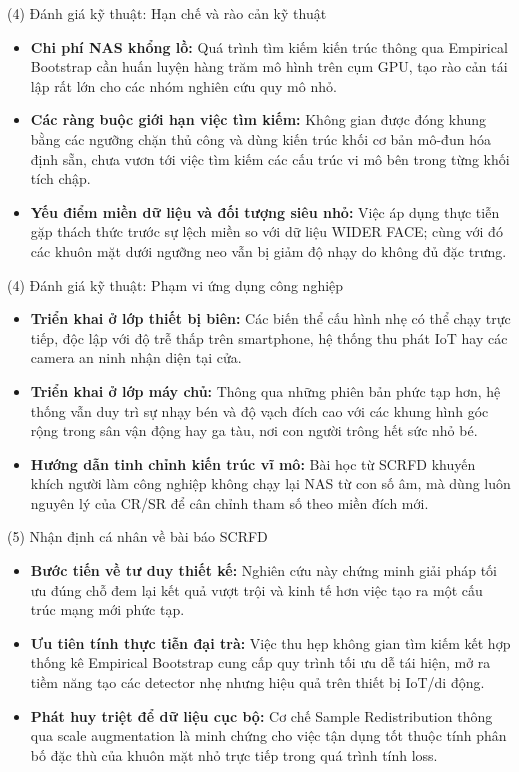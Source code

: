 \documentclass[aspectratio=169,11pt]{beamer}
\begin{document}
\begin{frame}{(4) Đánh giá kỹ thuật: Hạn chế và rào cản kỹ thuật}
  \begin{itemize}
    \setlength{\itemsep}{8pt}
    \item \textbf{Chi phí NAS khổng lồ:} Quá trình tìm kiếm kiến trúc thông qua Empirical Bootstrap cần huấn luyện hàng trăm mô hình trên cụm GPU, tạo rào cản tái lập rất lớn cho các nhóm nghiên cứu quy mô nhỏ.\ \cite{guo2022scrfd}
    \item \textbf{Các ràng buộc giới hạn việc tìm kiếm:} Không gian được đóng khung bằng các ngưỡng chặn thủ công và dùng kiến trúc khối cơ bản mô-đun hóa định sẵn, chưa vươn tới việc tìm kiếm các cấu trúc vi mô bên trong từng khối tích chập.
    \item \textbf{Yếu điểm miền dữ liệu và đối tượng siêu nhỏ:} Việc áp dụng thực tiễn gặp thách thức trước sự lệch miền so với dữ liệu WIDER FACE; cùng với đó các khuôn mặt dưới ngưỡng neo vẫn bị giảm độ nhạy do không đủ đặc trưng.
  \end{itemize}
\end{frame}

\begin{frame}{(4) Đánh giá kỹ thuật: Phạm vi ứng dụng công nghiệp}
  \begin{itemize}
    \setlength{\itemsep}{8pt}
    \item \textbf{Triển khai ở lớp thiết bị biên:} Các biến thể cấu hình nhẹ có thể chạy trực tiếp, độc lập với độ trễ thấp trên smartphone, hệ thống thu phát IoT hay các camera an ninh nhận diện tại cửa.
    \item \textbf{Triển khai ở lớp máy chủ:} Thông qua những phiên bản phức tạp hơn, hệ thống vẫn duy trì sự nhạy bén và độ vạch đích cao với các khung hình góc rộng trong sân vận động hay ga tàu, nơi con người trông hết sức nhỏ bé.
    \item \textbf{Hướng dẫn tinh chỉnh kiến trúc vĩ mô:} Bài học từ SCRFD khuyến khích người làm công nghiệp không chạy lại NAS từ con số âm, mà dùng luôn nguyên lý của CR/SR để cân chỉnh tham số theo miền đích mới.
  \end{itemize}
\end{frame}

\begin{frame}{(5) Nhận định cá nhân về bài báo SCRFD}
  \begin{itemize}
    \setlength{\itemsep}{6pt}
    \item \textbf{Bước tiến về tư duy thiết kế:} Nghiên cứu này chứng minh giải pháp tối ưu đúng chỗ đem lại kết quả vượt trội và kinh tế hơn việc tạo ra một cấu trúc mạng mới phức tạp.
    \item \textbf{Ưu tiên tính thực tiễn đại trà:} Việc thu hẹp không gian tìm kiếm kết hợp thống kê Empirical Bootstrap cung cấp quy trình tối ưu dễ tái hiện, mở ra tiềm năng tạo các detector nhẹ nhưng hiệu quả trên thiết bị IoT/di động.
    \item \textbf{Phát huy triệt để dữ liệu cục bộ:} Cơ chế Sample Redistribution thông qua scale augmentation là minh chứng cho việc tận dụng tốt thuộc tính phân bố đặc thù của khuôn mặt nhỏ trực tiếp trong quá trình tính loss.
  \end{itemize}
\end{frame}
\end{document}
